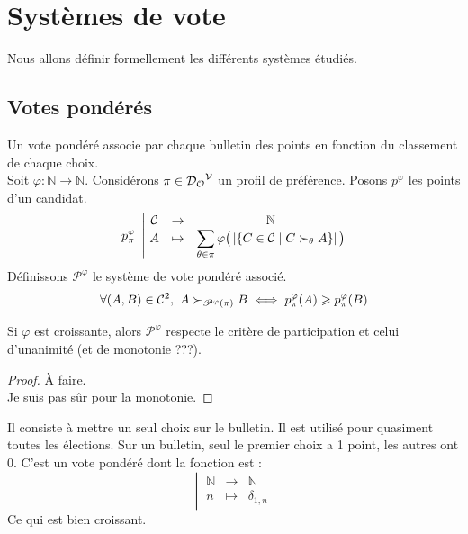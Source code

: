 
\section{Systèmes de vote}

Nous allons définir formellement les différents systèmes étudiés.

\subsection{Votes pondérés}

\begin{definition}
	Un vote pondéré associe par chaque bulletin des points en fonction du classement de chaque choix. \\
	Soit $\varphi : \mathbb{N} \rightarrow \mathbb{N}$. Considérons $\pi \in {\mathcal{D}_\mathcal{O}}^{\mathcal{V}}$ un profil de préférence. Posons $p^\varphi$ les points d'un candidat.
	\begin{equation*}
		p_\pi^\varphi \
		\left| \ \begin{matrix}
			\mathcal{C} &\rightarrow& \mathbb{N} \\
			A &\mapsto& \displaystyle \sum_{\theta \in \pi} \varphi \big( \left| \{ C \in \mathcal{C} \;|\; C \succ_\theta A \} \right| \big)
		\end{matrix} \right.
	\end{equation*}
	  Définissons $\mathscr{P}^\varphi$ le système de vote pondéré associé.
	\begin{equation}
		\forall (A, B) \in \mathcal{C}^2, \
		A \succ_{\mathscr{P}^\varphi(\pi)} B
		\iff p_\pi^\varphi(A) \geqslant p_\pi^\varphi(B)
	\end{equation}
\end{definition}

\begin{theoreme}
	Si $\varphi$ est croissante, alors $\mathscr{P}^\varphi$ respecte le critère de participation et celui d'unanimité (et de monotonie ???).
\end{theoreme}

\begin{proof}
	À faire. \\
	Je suis pas sûr pour la monotonie.
\end{proof}

\begin{definition}
	Il consiste à mettre un seul choix sur le bulletin. Il est utilisé pour quasiment toutes les élections. Sur un bulletin, seul le premier choix a 1 point, les autres ont 0. C'est un vote pondéré dont la fonction est :
	\begin{equation}
		\left| \ \begin{matrix}
			\mathbb{N} &\rightarrow& \mathbb{N} \\
			n &\mapsto& \delta_{1, n}
		\end{matrix} \right.
	\end{equation}
	Ce qui est bien croissant.
\end{definition}

